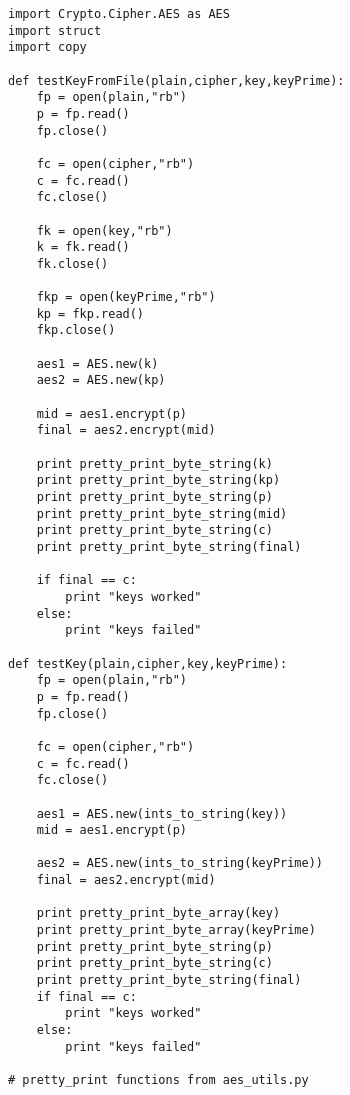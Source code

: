 \documentclass[11pt]{article}
\begin{document}
\begin{verbatim}
import Crypto.Cipher.AES as AES
import struct
import copy

def testKeyFromFile(plain,cipher,key,keyPrime):
    fp = open(plain,"rb")
    p = fp.read()
    fp.close()

    fc = open(cipher,"rb")
    c = fc.read()
    fc.close()

    fk = open(key,"rb")
    k = fk.read()
    fk.close()

    fkp = open(keyPrime,"rb")
    kp = fkp.read()
    fkp.close()

    aes1 = AES.new(k)
    aes2 = AES.new(kp)

    mid = aes1.encrypt(p)
    final = aes2.encrypt(mid)

    print pretty_print_byte_string(k)
    print pretty_print_byte_string(kp)
    print pretty_print_byte_string(p)
    print pretty_print_byte_string(mid)
    print pretty_print_byte_string(c)
    print pretty_print_byte_string(final)
    
    if final == c:
        print "keys worked"
    else:
        print "keys failed"

def testKey(plain,cipher,key,keyPrime):
    fp = open(plain,"rb")
    p = fp.read()
    fp.close()

    fc = open(cipher,"rb")
    c = fc.read()
    fc.close()

    aes1 = AES.new(ints_to_string(key))
    mid = aes1.encrypt(p)
    
    aes2 = AES.new(ints_to_string(keyPrime))
    final = aes2.encrypt(mid)

    print pretty_print_byte_array(key)
    print pretty_print_byte_array(keyPrime)
    print pretty_print_byte_string(p)
    print pretty_print_byte_string(c)
    print pretty_print_byte_string(final)
    if final == c:
        print "keys worked"
    else:
        print "keys failed"

# pretty_print functions from aes_utils.py
\end{verbatim}
\end{document}

